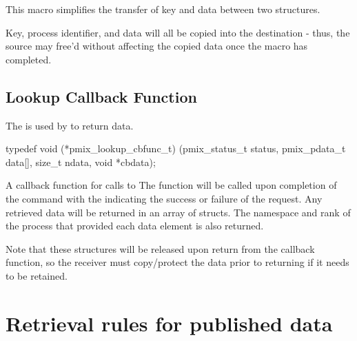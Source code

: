 This macro simplifies the transfer of key and data between two structures.

\adviceuserstart
Key, process identifier, and data will all be copied into the destination  - thus, the source  may free'd without affecting the copied data once the macro has completed.
\adviceuserend


\subsection{Lookup Callback Function}

\summary

The  is used by  to return data.

\cspecificstart
\begin{codepar}
typedef void (*pmix_lookup_cbfunc_t)
    (pmix_status_t status,
     pmix_pdata_t data[], size_t ndata,
     void *cbdata);
\end{codepar}
\cspecificend

\begin{arglist}
\end{arglist}


\descr

A callback function for calls to 
The function will be called upon completion of the command with the  indicating the success or failure of the request.
Any retrieved data will be returned in an array of  structs.
The namespace and rank of the process that provided each data element is also returned.

Note that these structures will be released upon return from the callback function, so the receiver must copy/protect the data prior to returning if it needs to be retained.



\section{Retrieval rules for published data}


